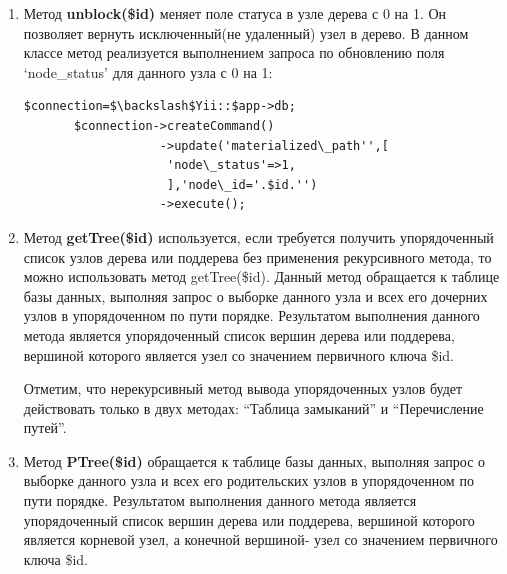 \documentclass[a4paper,14pt]{extreport}
\theoremstyle{definition}
\begin{document}
\begin{enumerate}
\item Метод \textbf{unblock(\$id)} меняет поле статуса в узле дерева с 0 на 1. Он позволяет вернуть исключенный(не удаленный) узел в дерево. В данном классе метод реализуется выполнением запроса по обновлению поля ‘node\_status’ для данного узла с 0 на 1:\begin{verbatim}
$connection=$\backslash$Yii::$app->db;
       $connection->createCommand()
                   ->update('materialized\_path'',[
                    'node\_status'=>1,
                    ],'node\_id='.$id.'')
                   ->execute();\end{verbatim}
\item Метод \textbf{getTree(\$id)} используется, если требуется получить упорядоченный список узлов дерева или поддерева без применения рекурсивного метода, то можно использовать метод getTree(\$id). Данный метод обращается к таблице базы данных, выполняя запрос о выборке данного узла и всех его дочерних узлов в упорядоченном по пути порядке. Результатом выполнения данного метода является упорядоченный список вершин дерева или поддерева, вершиной которого является узел со значением первичного ключа \$id.

Отметим, что нерекурсивный метод вывода упорядоченных узлов будет действовать только в двух методах: “Таблица замыканий” и “Перечисление путей”.
\item Метод \textbf{PTree(\$id)} обращается к таблице базы данных, выполняя запрос о выборке данного узла и всех его родительских узлов в упорядоченном по пути порядке. Результатом выполнения данного метода является упорядоченный список вершин дерева или поддерева, вершиной которого является корневой узел, а конечной вершиной- узел со значением первичного ключа \$id.


\end{enumerate}
\end{document}
